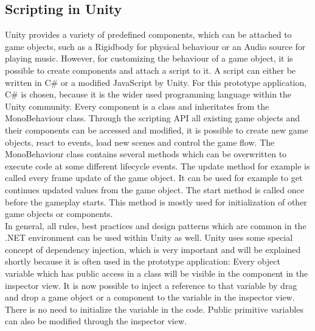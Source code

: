 \subsection{Scripting in Unity}
Unity provides a variety of predefined components, which can be attached to game objects, such as a Rigidbody for physical behaviour or an Audio source for playing music. However, for customizing the behaviour of a game object, it is possible to create components and attach a script to it. A script can either be written in C\# or a  modified JavaScript by Unity. For this prototype application, C\# is chosen, because it is the wider used programming language within the Unity community. Every component is a class and inheritates from the MonoBehaviour class. Through the scripting API all existing game objects and their components can be accessed and modified, it is possible to create new game objects, react to events, load new scenes and control the game flow. The MonoBehaviour class contains several methods which can be overwritten to execute code at some different lifecycle events. The update method for example is called every frame update of the game object. It can be used for example to get continues updated values from the game object. The start method is called once before the gameplay starts. This method is mostly used for initialization of other game objects or components.\\
In general, all rules, best practices and design patterns which are common in the .NET environment can be used within Unity as well. Unity uses some special concept of dependency injection, which is very important and will be explained shortly because it is often used in the prototype application: Every object variable which has public access in a class will be visible in the component in the inspector view. It is now possible to inject a reference to that variable by drag and drop a game object or a component to the variable in the inspector view. There is no need to initialize the variable in the code. Public primitive variables can also be modified through the inspector view.

